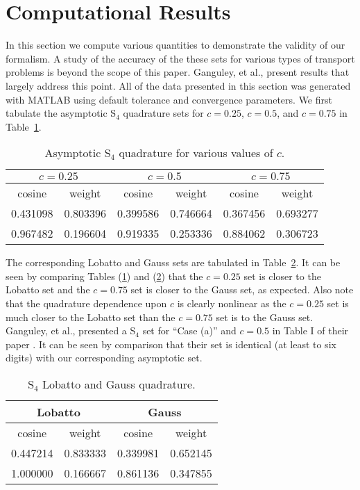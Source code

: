 \documentclass[12pt]{article}
\newcommand{\LTA}[1]{\label{ta:#1}}
\newcommand{\TA}[1]{Table~\ref{ta:#1}}
\newcommand{\RTA}[1]{\ref{ta:#1}}
\newcommand{\bc}{\begin{center}}
\newcommand{\ec}{\end{center}}
\begin{document}
\section{Computational Results}

In this section we compute various quantities to demonstrate the validity of our formalism.  A study of the accuracy of the these sets for various types 
of transport problems is beyond the scope of this paper.  Ganguley, et al., \cite{ganguley} present results that largely address this point.  All of the data presented in this section was generated with MATLAB using default tolerance and convergence parameters.  We first tabulate the asymptotic S$_4$ quadrature sets for $c=0.25$, $c=0.5$, and $c=0.75$ in \TA{1}.  
\begin{table}[!h]
\begin{center} 
\begin{tabular}{|c|c|c|c|c|c|}
\hline
\hline
\multicolumn{2}{|c|}{$c=0.25$}&\multicolumn{2}{|c|}{$c=0.5$}&\multicolumn{2}{|c|}{$c=0.75$}\\
\hline
 cosine & weight & cosine & weight & cosine & weight\\
 \hline
0.431098  & 0.803396  & 0.399586  &  0.746664 &  0.367456    & 0.693277\\
0.967482  & 0.196604  & 0.919335  &  0.253336 &  0.884062    & 0.306723\\
\hline
\hline
\end{tabular}
\caption{Asymptotic S$_4$ quadrature for various values of $c$.}
\LTA{1}
\end{center}
\end{table}
\afterpage{\clearpage}

The corresponding Lobatto and Gauss sets are tabulated in \TA{2}. 
It can be seen by comparing Tables (\RTA{1}) and (\RTA{2}) that the $c=0.25$ set is closer to the Lobatto set and the $c=0.75$ set is closer to the 
Gauss set, as expected.  Also note that the quadrature dependence upon $c$ is clearly nonlinear as the $c=0.25$ set is much closer to the Lobatto set 
than the $c=0.75$ set is to the Gauss set.  Ganguley, et al., presented a S$_4$ set for ``Case (a)'' and $c=0.5$ in Table I of their paper \cite{ganguley}.
It can be seen by comparison that their set is identical (at least to six digits) with our corresponding asymptotic set.
\begin{table}[!h]
\begin{center} 
\begin{tabular}{|c|c|c|c|}
\hline
\hline
\multicolumn{2}{|c|}{Lobatto} &\multicolumn{2}{|c|}{Gauss}\\
\hline
 cosine & weight & cosine & weight\\
 \hline
0.447214 & 0.833333 & 0.339981 & 0.652145  \\
1.000000 & 0.166667 & 0.861136 & 0.347855  \\
\hline
\hline
\end{tabular}
\caption{S$_4$ Lobatto and Gauss quadrature.}
\LTA{2}
\end{center}
\end{table}
\afterpage{\clearpage}
\end{document}
